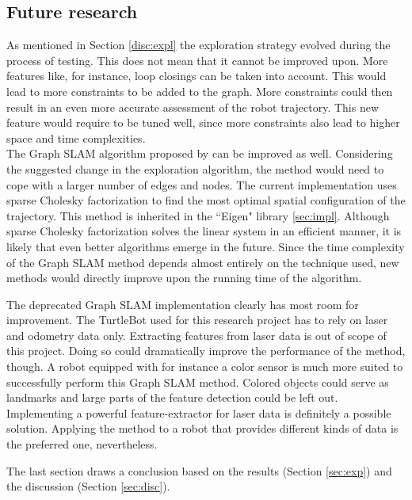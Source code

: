 \documentclass{ba-kecs}
\begin{document}
\subsection{Future research}
As mentioned in Section \ref{disc:expl} the exploration strategy evolved during the process of testing. This does not mean that it cannot be improved upon. More features like, for instance, loop closings can be taken into account. This would lead to more constraints to be added to the graph. More constraints could then result in an even more accurate assessment of the robot trajectory. This new feature would require to be tuned well, since more constraints also lead to higher space and time complexities. 
\\

The Graph SLAM algorithm proposed by \citep{Grisetti} can be improved as well. Considering the suggested change in the exploration algorithm, the method would need to cope with a larger number of edges and nodes.
The current implementation uses sparse Cholesky factorization to find the most optimal spatial configuration of the trajectory. This method is inherited in the ``Eigen" library \ref{sec:impl}. Although sparse Cholesky factorization solves the linear system in an efficient manner, it is likely that even better algorithms emerge in the future. Since the time complexity of the Graph SLAM method depends almost entirely on the technique used, new methods would directly improve upon the running time of the algorithm.

The deprecated Graph SLAM implementation clearly has most room for improvement. The TurtleBot used for this research project has to rely on laser and odometry data only. Extracting features from laser data is out of scope of this project. Doing so could dramatically improve the performance of the method, though. 
A robot equipped with for instance a color sensor is much more suited to successfully perform this Graph SLAM method. Colored objects could serve as landmarks and large parts of the feature detection could be left out. Implementing a powerful feature-extractor for laser data is definitely a possible solution. Applying the method to a robot that provides different kinds of data is the preferred one, nevertheless.

The last section draws a conclusion based on the results (Section \ref{sec:exp}) and the discussion (Section \ref{sec:disc}).
\end{document}
